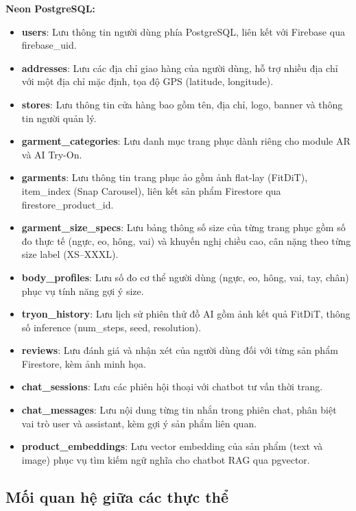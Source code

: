 \textbf{Neon PostgreSQL:}
\begin{itemize}[noitemsep]
    \item \textbf{users}: Lưu thông tin người dùng phía
    PostgreSQL, liên kết với Firebase qua firebase\_uid.
    \item \textbf{addresses}: Lưu các địa chỉ giao hàng
    của người dùng, hỗ trợ nhiều địa chỉ với một địa chỉ
    mặc định, tọa độ GPS (latitude, longitude).
    \item \textbf{stores}: Lưu thông tin cửa hàng bao gồm
    tên, địa chỉ, logo, banner và thông tin người quản lý.
    \item \textbf{garment\_categories}: Lưu danh mục trang
    phục dành riêng cho module AR và AI Try-On.
    \item \textbf{garments}: Lưu thông tin trang phục ảo gồm
    ảnh flat-lay (FitDiT), item\_index (Snap Carousel),
    liên kết sản phẩm Firestore qua firestore\_product\_id.
    \item \textbf{garment\_size\_specs}: Lưu bảng thông số
    size của từng trang phục gồm số đo thực tế (ngực, eo,
    hông, vai) và khuyến nghị chiều cao, cân nặng theo
    từng size label (XS--XXXL).
    \item \textbf{body\_profiles}: Lưu số đo cơ thể người
    dùng (ngực, eo, hông, vai, tay, chân) phục vụ tính
    năng gợi ý size.
    \item \textbf{tryon\_history}: Lưu lịch sử phiên thử
    đồ AI gồm ảnh kết quả FitDiT, thông số inference
    (num\_steps, seed, resolution).
    \item \textbf{reviews}: Lưu đánh giá và nhận xét của
    người dùng đối với từng sản phẩm Firestore, kèm
    ảnh minh họa.
    \item \textbf{chat\_sessions}: Lưu các phiên hội thoại
    với chatbot tư vấn thời trang.
    \item \textbf{chat\_messages}: Lưu nội dung từng tin
    nhắn trong phiên chat, phân biệt vai trò user và
    assistant, kèm gợi ý sản phẩm liên quan.
    \item \textbf{product\_embeddings}: Lưu vector embedding
    của sản phẩm (text và image) phục vụ tìm kiếm ngữ
    nghĩa cho chatbot RAG qua pgvector.
\end{itemize}

\subsection*{Mối quan hệ giữa các thực thể}

